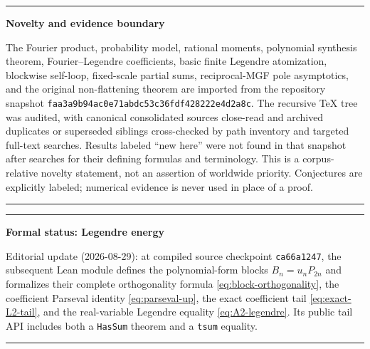 \documentclass[11pt,oneside]{article}
\numberwithin{equation}{section}
\theoremstyle{definition}
\theoremstyle{remark}
\newenvironment{statusbox}[1]{%
  \par\smallskip\noindent\begin{center}\begin{minipage}{0.94\textwidth}%
  \hrule\vspace{0.55em}\noindent\textbf{#1}\par\smallskip
}{%
  \vspace{0.55em}\hrule\end{minipage}\end{center}\smallskip
}
\begin{document}
\begin{statusbox}{Novelty and evidence boundary}
The Fourier product, probability model, rational moments, polynomial synthesis
theorem, Fourier--Legendre coefficients, basic finite Legendre atomization,
blockwise self-loop, fixed-scale partial sums, reciprocal-MGF pole asymptotics,
and the original non-flattening theorem are imported from the repository
snapshot \texttt{faa3a9b94ac0e71abdc53c36fdf428222e4d2a8c}.  The recursive
TeX tree was audited, with canonical consolidated sources close-read and
archived duplicates or superseded siblings cross-checked by path inventory and
targeted full-text searches.  Results labeled ``new here'' were not found in
that snapshot after searches for their defining formulas and terminology.
This is a corpus-relative novelty statement, not an assertion of worldwide
priority.  Conjectures are explicitly labeled; numerical evidence is never
used in place of a proof.
\end{statusbox}

\begin{statusbox}{Formal status: Legendre energy}
Editorial update (2026-08-29): at compiled source checkpoint
\texttt{ca66a1247}, the subsequent Lean module
 defines the polynomial-form blocks
$B_n=u_nP_{2n}$ and formalizes their complete orthogonality formula
\eqref{eq:block-orthogonality}, the coefficient Parseval identity
\eqref{eq:parseval-up}, the exact coefficient tail
\eqref{eq:exact-L2-tail}, and the real-variable Legendre equality
\eqref{eq:A2-legendre}.  Its public tail API includes both a
\texttt{HasSum} theorem and a \texttt{tsum} equality.
\end{statusbox}
\end{document}
